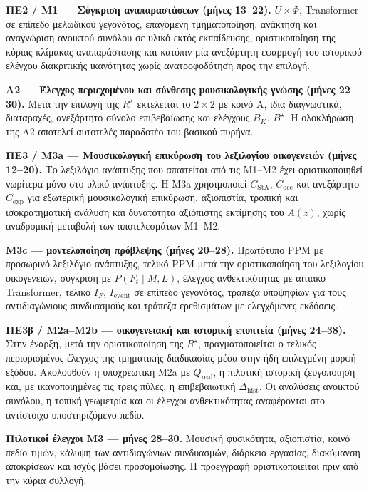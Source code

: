 \documentclass[11pt,a4paper]{article}
\begin{document}
\textbf{ΠΕ2 / M1 --- Σύγκριση αναπαραστάσεων (μήνες 13--22).} $U\times\Phi$, Transformer σε επίπεδο μελωδικού γεγονότος, επαγόμενη τμηματοποίηση, ανάκτηση και αναγνώριση ανοικτού συνόλου σε υλικό εκτός εκπαίδευσης, οριστικοποίηση της κύριας κλίμακας αναπαράστασης και κατόπιν μία ανεξάρτητη εφαρμογή του ιστορικού ελέγχου διακριτικής ικανότητας χωρίς ανατροφοδότηση προς την επιλογή.

\textbf{Α2 --- Έλεγχος περιεχομένου και σύνθεσης μουσικολογικής γνώσης (μήνες 22--30).} Μετά την επιλογή της $R^\star$ εκτελείται το $2\times2$ με κοινό A, ίδια διαγνωστικά, διαταραχές, ανεξάρτητο σύνολο επιβεβαίωσης και ελέγχους $B_K$, $B^\star$. Η ολοκλήρωση της Α2 αποτελεί αυτοτελές παραδοτέο του βασικού πυρήνα.

\textbf{ΠΕ3 / M3a --- Μουσικολογική επικύρωση του λεξιλογίου οικογενειών (μήνες 12--20).} Το λεξιλόγιο ανάπτυξης που απαιτείται από τις M1--M2 έχει οριστικοποιηθεί νωρίτερα μόνο στο υλικό ανάπτυξης. Η M3a χρησιμοποιεί $C_{\mathrm{StA}}$, $C_{\mathrm{occ}}$ και ανεξάρτητο $C_{\mathrm{exp}}$ για εξωτερική μουσικολογική επικύρωση, αξιοπιστία, τροπική και ισοκρατηματική ανάλυση και δυνατότητα αξιόπιστης εκτίμησης του $A(z)$, χωρίς αναδρομική μεταβολή των αποτελεσμάτων M1--M2.

\textbf{M3c --- μοντελοποίηση πρόβλεψης (μήνες 20--28).} Πρωτότυπο PPM με προσωρινό λεξιλόγιο ανάπτυξης, τελικό PPM μετά την οριστικοποίηση του λεξιλογίου οικογενειών, σύγκριση με $P(F_t\mid M,L)$, έλεγχος ανθεκτικότητας με αιτιακό Transformer, τελικό $I_F$, $I_{\mathrm{event}}$ σε επίπεδο γεγονότος, τράπεζα υποψηφίων για τους αντιδιαγώνιους συνδυασμούς και τράπεζα ερεθισμάτων με ελεγχόμενες εκδόσεις.

\textbf{ΠΕ3β / M2a--M2b --- οικογενειακή και ιστορική εποπτεία (μήνες 24--38).} Στην έναρξη, μετά την οριστικοποίηση της $R^\star$, πραγματοποιείται ο τελικός περιορισμένος έλεγχος της τμηματικής διαδικασίας μέσα στην ήδη επιλεγμένη μορφή εξόδου. Ακολουθούν η υποχρεωτική Μ2a με $Q_{\mathrm{real}}$, η πιλοτική ιστορική ζευγοποίηση και, με ικανοποιημένες τις τρεις πύλες, η επιβεβαιωτική $\Delta_{\mathrm{hist}}$. Οι αναλύσεις ανοικτού συνόλου, η τοπική γεωμετρία και οι έλεγχοι ανθεκτικότητας αναφέρονται στο αντίστοιχο υποστηριζόμενο πεδίο.

\textbf{Πιλοτικοί έλεγχοι M3 --- μήνες 28--30.} Μουσική φυσικότητα, αξιοπιστία, κοινό πεδίο τιμών, κάλυψη των αντιδιαγώνιων συνδυασμών, διάρκεια εργασίας, διακύμανση αποκρίσεων και ισχύς βάσει προσομοίωσης. Η προεγγραφή οριστικοποιείται πριν από την κύρια συλλογή.
\end{document}
